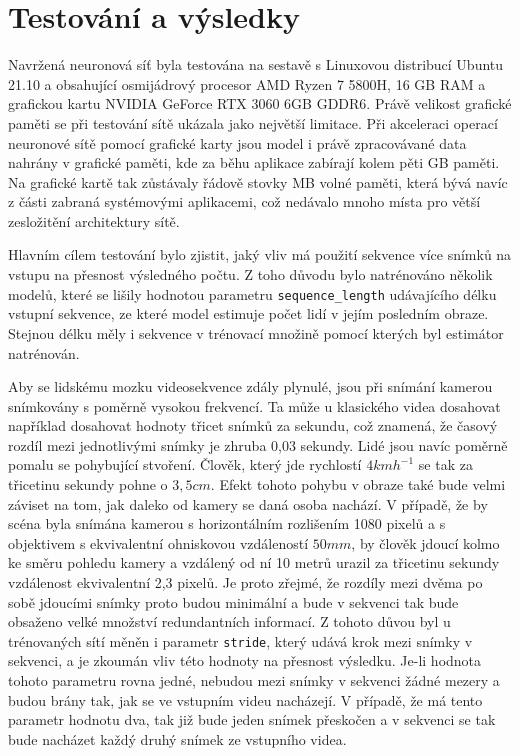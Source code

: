 \chapter{Testování a výsledky}
\label{sec:Testing}

Navržená neuronová síť byla testována na sestavě s Linuxovou distribucí Ubuntu 21.10 a obsahující osmijádrový procesor AMD Ryzen 7 5800H, 16 GB RAM a grafickou kartu NVIDIA GeForce RTX 3060 6GB GDDR6.
Právě velikost grafické paměti se při testování sítě ukázala jako největší limitace.
Při akceleraci operací neuronové sítě pomocí grafické karty jsou model i právě zpracovávané data nahrány v grafické paměti, kde za běhu aplikace zabírají kolem pěti GB paměti. 
Na grafické kartě tak zůstávaly řádově stovky MB volné paměti, která bývá navíc z části zabraná systémovými aplikacemi, což nedávalo mnoho místa pro větší zesložitění architektury sítě.

Hlavním cílem testování bylo zjistit, jaký vliv má použití sekvence více snímků na vstupu na přesnost výsledného počtu.
Z toho důvodu bylo natrénováno několik modelů, které se lišily hodnotou parametru \texttt{sequence\_length} udávajícího délku vstupní sekvence, ze které model estimuje počet lidí v jejím posledním obraze.
Stejnou délku měly i sekvence v trénovací množině pomocí kterých byl estimátor natrénován.

Aby se lidskému mozku videosekvence zdály plynulé, jsou při snímání kamerou snímkovány s poměrně vysokou frekvencí. 
Ta může u klasického videa dosahovat například dosahovat hodnoty třicet snímků za sekundu, což znamená, že časový rozdíl mezi jednotlivými snímky je zhruba 0,03 sekundy.
Lidé jsou navíc poměrně pomalu se pohybující stvoření.
Člověk, který jde rychlostí \(4 kmh^{-1}\) se tak za třicetinu sekundy pohne o \(3,5 cm\).
Efekt tohoto pohybu v obraze také bude velmi záviset na tom, jak daleko od kamery se daná osoba nachází. 
V případě, že by scéna byla snímána kamerou s horizontálním rozlišením 1080 pixelů a s objektivem s ekvivalentní ohniskovou vzdáleností \(50 mm\), by člověk jdoucí kolmo ke směru pohledu kamery a vzdálený od ní 10 metrů urazil za třicetinu sekundy vzdálenost ekvivalentní 2,3 pixelů.
Je proto zřejmé, že rozdíly mezi dvěma po sobě jdoucími snímky proto budou minimální a bude v sekvenci tak bude obsaženo velké množství redundantních informací.
Z tohoto důvou byl u trénovaných sítí měněn i parametr \texttt{stride}, který udává krok mezi snímky v sekvenci, a je zkoumán vliv této hodnoty na přesnost výsledku.
Je-li hodnota tohoto parametru rovna jedné, nebudou mezi snímky v sekvenci žádné mezery a budou brány tak, jak se ve vstupním videu nacházejí.
V případě, že má tento parametr hodnotu dva, tak již bude jeden snímek přeskočen a v sekvenci se tak bude nacházet každý druhý snímek ze vstupního videa.

